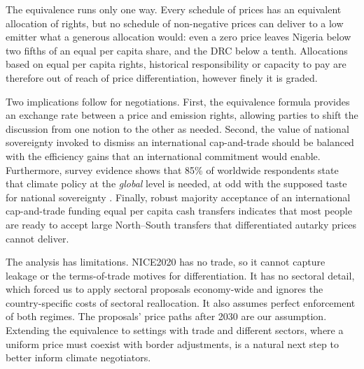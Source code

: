 \documentclass[12pt,english]{article}
\newif\ifblind
\theoremstyle{remark}
\begin{document}
The equivalence runs only one way. Every schedule of prices has an equivalent allocation of rights, but no schedule of non-negative prices can deliver to a low emitter what a generous allocation would: even a zero price leaves Nigeria below two fifths of an equal per capita share, and the DRC below a tenth. Allocations based on equal per capita rights, historical responsibility or capacity to pay are therefore out of reach of price differentiation, however finely it is graded.

Two implications follow for negotiations. First, the equivalence formula provides an exchange rate between a price and emission rights, allowing parties to shift the discussion from one notion to the other as needed. %
Second, the value of national sovereignty invoked to dismiss an international cap-and-trade should be balanced with the efficiency gains that an international commitment would enable. 
Furthermore, survey evidence shows %
that 85\% of worldwide respondents state that climate policy at the \textit{global} level is needed, at odd with the supposed taste for national sovereignty \citep{fabre_majority_2025}. Finally, robust majority acceptance of an international cap-and-trade funding equal per capita cash transfers indicates that most people are ready to accept large North--South transfers that differentiated autarky prices cannot deliver.

The analysis has limitations. NICE2020 has no trade, so it cannot capture leakage or the terms-of-trade motives for differentiation. It has no sectoral detail, which forced us to apply sectoral proposals economy-wide and ignores the country-specific costs of sectoral reallocation. It also assumes perfect enforcement of both regimes. The proposals' price paths after 2030 are our assumption. Extending the equivalence to settings with trade and different sectors, where a uniform price must coexist with border adjustments, is a natural next step to better inform climate negotiators.

\ifblind\else
\end{document}
